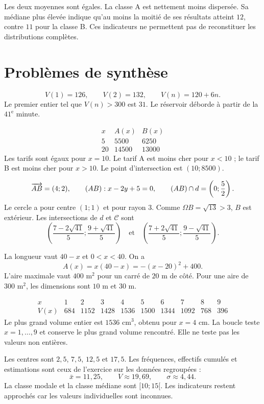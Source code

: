 Les deux moyennes sont égales. La classe A est nettement moins dispersée.
Sa médiane plus élevée indique qu'au moins la moitié de ses résultats atteint
$12$, contre $11$ pour la classe B. Ces indicateurs ne permettent pas de
reconstituer les distributions complètes.

\section*{Problèmes de synthèse}

\[
V(1)=126,\qquad V(2)=132,\qquad V(n)=120+6n.
\]
Le premier entier tel que $V(n)>300$ est $31$. Le réservoir déborde à partir
de la $41^{\mathrm e}$ minute.

\[
\begin{array}{c|cc}
x&A(x)&B(x)\\ \hline
5&5500&6250\\
20&14500&13000
\end{array}
\]
Les tarifs sont égaux pour $x=10$. Le tarif A est moins cher pour $x<10$ ;
le tarif B est moins cher pour $x>10$. Le point d'intersection est
$(10;8500)$.

\[
\overrightarrow{AB}=(4;2),\qquad (AB):x-2y+5=0,\qquad
(AB)\cap d=\left(0;\frac52\right).
\]
Le cercle a pour centre $(1;1)$ et pour rayon $3$. Comme
$\Omega B=\sqrt{13}>3$, $B$ est extérieur. Les intersections de $d$ et
$\mathcal C$ sont
\[
\left(\frac{7-2\sqrt{41}}5;\frac{9+\sqrt{41}}5\right)
\quad\text{et}\quad
\left(\frac{7+2\sqrt{41}}5;\frac{9-\sqrt{41}}5\right).
\]

La longueur vaut $40-x$ et $0<x<40$. On a
\[
A(x)=x(40-x)=-(x-20)^2+400.
\]
L'aire maximale vaut $400$ m$^2$ pour un carré de $20$ m de côté.
Pour une aire de $300$ m$^2$, les dimensions sont $10$ m et $30$ m.

\[
\begin{array}{c|rrrrrrrrr}
x&1&2&3&4&5&6&7&8&9\\ \hline
V(x)&684&1152&1428&1536&1500&1344&1092&768&396
\end{array}
\]
Le plus grand volume entier est $1536$ cm$^3$, obtenu pour $x=4$ cm.
La boucle teste $x=1,\ldots,9$ et conserve le plus grand volume rencontré.
Elle ne teste pas les valeurs non entières.

Les centres sont $2{,}5$, $7{,}5$, $12{,}5$ et $17{,}5$. Les fréquences,
effectifs cumulés et estimations sont ceux de l'exercice sur les données
regroupées :
\[
\bar x=11{,}25,\qquad V\approx19{,}69,\qquad \sigma\approx4{,}44.
\]
La classe modale et la classe médiane sont $[10;15[$. Les indicateurs restent
approchés car les valeurs individuelles sont inconnues.

